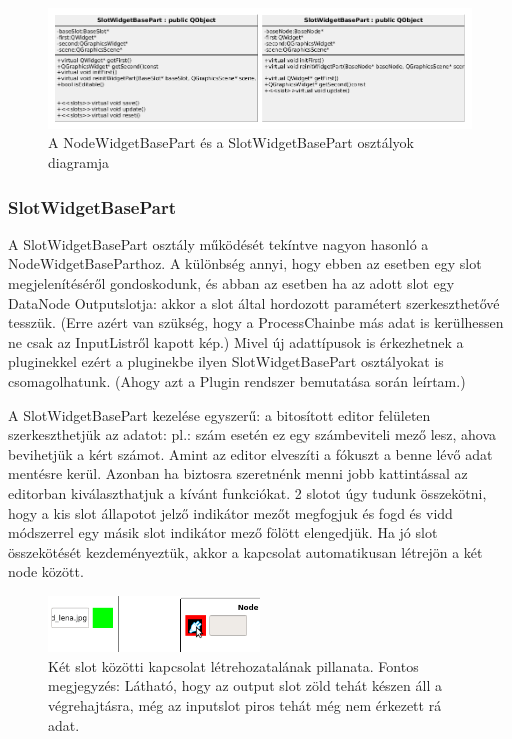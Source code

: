 \documentclass[a4paper,12pt,oneside]{report}
\begin{document}
\begin{center}
\begin{figure}[h]
  \includegraphics[width=1.1\textwidth]{node_slot_widgetpart.png}
  \caption{A NodeWidgetBasePart és a SlotWidgetBasePart osztályok diagramja}

  \label{fig:bimg_widget_slot_view_diag}
\end{figure}
\end{center}

\subsubsection{SlotWidgetBasePart}
A SlotWidgetBasePart osztály működését tekíntve nagyon hasonló a NodeWidgetBaseParthoz. A különbség annyi, hogy ebben az esetben egy slot megjelenítéséről gondoskodunk, és abban az esetben ha az adott slot egy DataNode Outputslotja: akkor a slot által hordozott paramétert szerkeszthetővé tesszük. (Erre azért van szükség, hogy a ProcessChainbe más adat is kerülhessen ne csak az InputListről kapott kép.) Mivel új adattípusok is érkezhetnek a pluginekkel ezért a pluginekbe ilyen SlotWidgetBasePart osztályokat is csomagolhatunk. (Ahogy azt a Plugin rendszer bemutatása során leírtam.)

A SlotWidgetBasePart kezelése egyszerű: a bitosított editor felületen szerkeszthetjük az adatot: pl.: szám esetén ez egy számbeviteli mező lesz, ahova bevihetjük a kért számot. Amint az editor elveszíti a fókuszt a benne lévő adat mentésre kerül. Azonban ha biztosra szeretnénk menni jobb kattintással az editorban kiválaszthatjuk a kívánt funkciókat.
2 slotot úgy tudunk összekötni, hogy a kis slot állapotot jelző indikátor mezőt megfogjuk és fogd és vidd módszerrel egy másik slot indikátor mező fölött elengedjük. Ha jó slot összekötését kezdeményeztük, akkor a kapcsolat automatikusan létrejön a két node között.

\begin{center}
\begin{figure}[h]
  \includegraphics[width=0.5\textwidth]{connection.png}
  \caption{Két slot közötti kapcsolat létrehozatalának pillanata. Fontos megjegyzés: Látható, hogy az output slot zöld tehát készen áll a végrehajtásra, még az inputslot piros tehát még nem érkezett rá adat.}

  \label{fig:bimg_just connection}
\end{figure}
\end{center}
\end{document}
